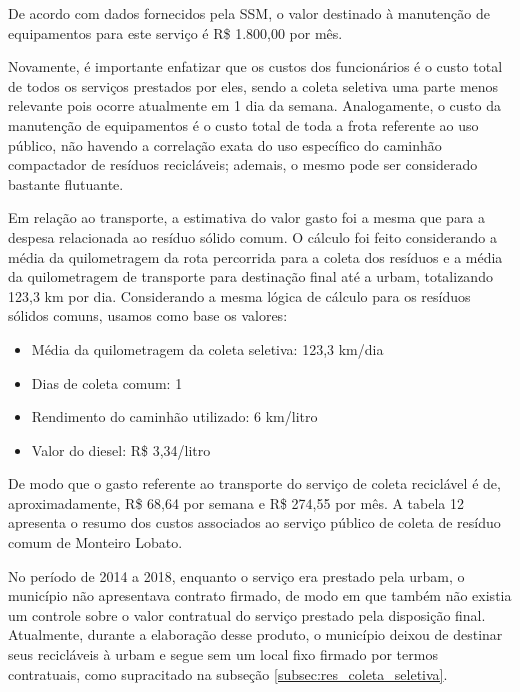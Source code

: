 	De acordo com dados fornecidos pela SSM, o valor destinado à manutenção de equipamentos para este serviço é R\$ 1.800,00 por mês. 
		
	Novamente, é importante enfatizar que os custos dos funcionários é o custo total de todos os serviços prestados por eles, sendo a coleta seletiva uma parte menos relevante pois ocorre atualmente em 1 dia da semana. Analogamente, o custo da manutenção de equipamentos é o custo total de toda a frota referente ao uso público, não havendo a correlação exata do uso específico do caminhão compactador de resíduos recicláveis; ademais, o mesmo pode ser considerado bastante flutuante.

	Em relação ao transporte, a estimativa do valor gasto foi a mesma que para a despesa relacionada ao resíduo sólido comum. O cálculo foi feito considerando a média da quilometragem da rota percorrida para a coleta dos resíduos e a média da quilometragem de transporte para destinação final até a \gls{urbam}, totalizando 123,3 km por dia. Considerando a mesma lógica de cálculo para os resíduos sólidos comuns, usamos como base os valores:
	
\begin{itemize}
	\item Média da quilometragem da coleta seletiva: 123,3 km/dia
	\item Dias de coleta comum: 1
	\item Rendimento do caminhão utilizado: 6 km/litro
	\item Valor do diesel: R\$ 3,34/litro
\end{itemize} 
	
	De modo que o gasto referente ao transporte do serviço de coleta reciclável é de, aproximadamente, R\$ 68,64 por semana e R\$ 274,55 por mês. A tabela 12 apresenta o resumo dos custos associados ao serviço público de coleta de resíduo comum de Monteiro Lobato.

	
	
	
	No período de 2014 a 2018, enquanto o serviço era prestado pela \gls{urbam}, o município não apresentava contrato firmado, de modo em que também não existia um controle sobre o valor contratual do serviço prestado pela disposição final. Atualmente, durante a elaboração desse produto, o município deixou de destinar seus recicláveis à \gls{urbam} e segue sem um local fixo firmado por termos contratuais, como supracitado na subseção \ref{subsec:res_coleta_seletiva}.
	
	
